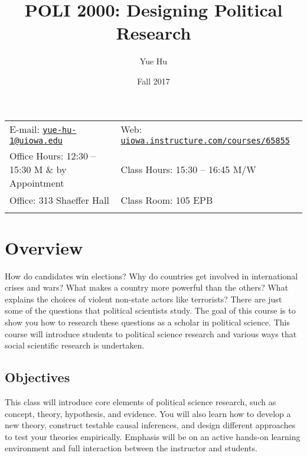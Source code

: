 \documentclass[11pt,]{article}
\title{POLI 2000: Designing Political Research}
\author{Yue Hu}
\date{Fall 2017}
\theoremstyle{definition}
\theoremstyle{definition}
\theoremstyle{remark}
\begin{document}
  

		\maketitle
		
	
		\thispagestyle{firststyle}



	\noindent \begin{tabular*}{\textwidth}{ @{\extracolsep{\fill}} ll @{\extracolsep{\fill}}}


E-mail: \texttt{\href{mailto:yue-hu-1@uiowa.edu}{\nolinkurl{yue-hu-1@uiowa.edu}}} & Web: \href{http://uiowa.instructure.com/courses/65855}{\tt uiowa.instructure.com/courses/65855}\\
Office Hours: 12:30 -- 15:30 M \& by Appointment  &  Class Hours: 15:30 -- 16:45 M/W\\
Office: 313 Shaeffer Hall  & Class Room: 105 EPB\\
	&  \\
	\hline
	\end{tabular*}
	
\vspace{2mm}
	


\section{Overview}\label{overview}

How do candidates win elections? Why do countries get involved in
international crises and wars? What makes a country more powerful than
the others? What explains the choices of violent non-state actors like
terrorists? There are just some of the questions that political
scientists study. The goal of this course is to show you how to research
these questions as a scholar in political science. This course will
introduce students to political science research and various ways that
social scientific research is undertaken.

\subsection{Objectives}\label{objectives}

This class will introduce core elements of political science research,
such as concept, theory, hypothesis, and evidence. You will also learn
how to develop a new theory, construct testable causal inferences, and
design different approaches to test your theories empirically. Emphasis
will be on an active hands-on learning environment and full interaction
between the instructor and students.
\end{document}
